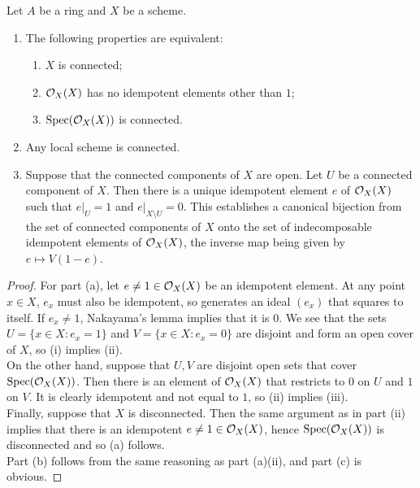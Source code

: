 \begin{exer}
	Let $A$ be a ring and $X$ be a scheme.
	\begin{enumerate}[label=(\alph*)]
		\item The following properties are equivalent:
			\begin{enumerate}[label=(\roman*)]
				\item $X$ is connected;
				\item $\mathcal{O}_X(X)$ has no idempotent elements
					other than $1$;
				\item $\operatorname{Spec}(\mathcal{O}_X(X))$ is connected.
			\end{enumerate}
		\item Any local scheme is connected.
		\item Suppose that the connected components of $X$ are open. Let
			$U$ be a connected component of $X$. Then there is a
			unique idempotent element $e$ of $\mathcal{O}_X(X)$ such that
			${e|}_U = 1$ and ${e|}_{X \setminus U} = 0$. This
			establishes a canonical bijection from the set of
			connected components of $X$ onto the set of
			indecomposable idempotent elements of $\mathcal{O}_X(X)$, the
			inverse map being given by $e \mapsto V(1-e)$.
	\end{enumerate}
\end{exer}
\begin{proof}
	For part (a), let $e \neq 1 \in \mathcal{O}_X(X)$ be an idempotent element. At
	any point $x \in X$, $e_x$ must also be idempotent, so generates an
	ideal $(e_x)$ that squares to itself. If $e_x \neq 1$, Nakayama's lemma
	implies that it is $0$. We see that the sets $U = \{x \in X: e_x = 1\}$
	and $V = \{x \in X: e_x = 0\}$ are disjoint and form an open cover of
	$X$, so (i) implies (ii).\\

	On the other hand, suppose that $U,V$ are disjoint open sets that cover
	$\operatorname{Spec}(\mathcal{O}_X(X))$. Then there is an element of $\mathcal{O}_X(X)$ that restricts
	to $0$ on $U$ and $1$ on $V$. It is clearly idempotent and not equal to
	$1$, so (ii) implies (iii).\\

	Finally, suppose that $X$ is disconnected. Then the same argument as in
	part (ii) implies that there is an idempotent $e \neq 1 \in \mathcal{O}_X(X)$,
	hence $\operatorname{Spec}(\mathcal{O}_X(X))$ is disconnected and so (a) follows.\\

	Part (b) follows from the same reasoning as part (a)(ii), and part (c)
	is obvious.
\end{proof}

